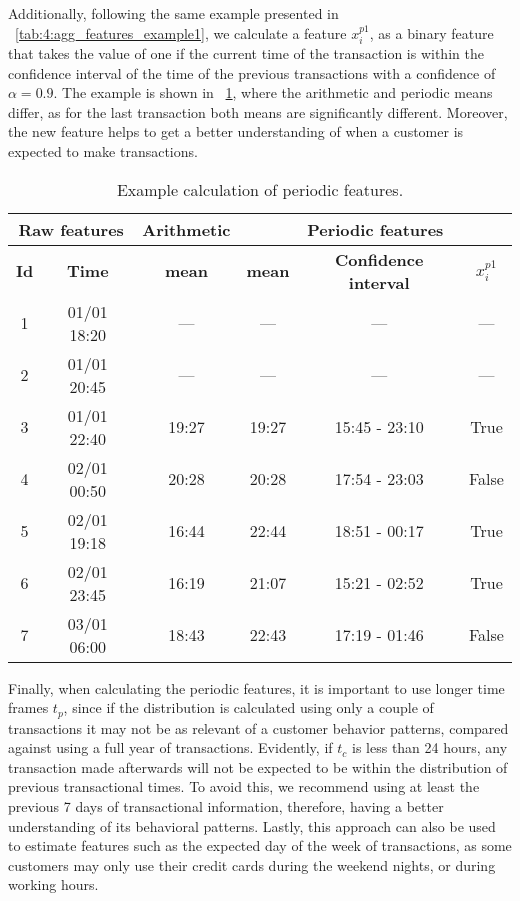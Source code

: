 Additionally, following the same example presented in 
\tablename{~\ref{tab:4:agg_features_example1}}, we calculate a feature $x_i^{p1}$, as a binary 
feature that takes the value of one if the current  time of the transaction is within the 
confidence interval of the time of the previous  transactions with a confidence of $\alpha=0.9$. 
The example is shown in \tablename{~\ref{tab:4:agg_features_example2}}, where the 
arithmetic and periodic   means differ, as for the last transaction both means are 
significantly different. Moreover, the  new feature helps to get a better understanding of 
when a customer is expected to make transactions.

	\begin{table}[!t]
   \centering
   \footnotesize
   \begin{tabular}{|c c | c | c c c|}
   \hline
   \multicolumn{2}{|c|}{\textbf{Raw features}} & \textbf{Arithmetic} & 
\multicolumn{3}{c|}{\textbf{Periodic features}} \\  \hline
   \textbf{Id} & \textbf{Time} & \textbf{mean} & \textbf{mean} & 
    \textbf{Confidence interval} & $x_i^{p1}$ \\
   \hline
		1& 01/01 18:20& --- & ---	 &	--- & ---\\
		2& 01/01 20:45& --- & ---	 &---	 & ---\\
		3& 01/01 22:40& 19:27 & 19:27 & 15:45 - 23:10 & True \\
		4& 02/01 00:50& 20:28 & 20:28 & 17:54 - 23:03 & False\\
		5& 02/01 19:18& 16:44 & 22:44 & 18:51 - 00:17 & True\\
		6& 02/01 23:45& 16:19 & 21:07 & 15:21 - 02:52 & True\\
		7& 03/01 06:00& 18:43 & 22:43 & 17:19 - 01:46 & False\\
   \hline
   \end{tabular}
   \caption{Example calculation of periodic features.}
   \label{tab:4:agg_features_example2}
   \end{table}
  
  Finally, when calculating the periodic features, it is important to use longer time frames $t_p$, 
  since if the distribution is calculated using only a couple of transactions it may not be as 
  relevant of a customer behavior patterns, compared against using a full year of transactions.
  Evidently, if $t_c$ is less than 24 hours, any transaction made afterwards will not be expected 
  to be within the distribution of previous transactional times. To avoid this, we recommend using 
  at least the previous 7 days of transactional information, therefore, having a better 
  understanding  of its behavioral patterns. Lastly, this approach can also be used to estimate 
  features such as  the expected day of the week  of transactions, as some customers may only use 
  their credit cards  during the weekend nights, or during working hours.
	
